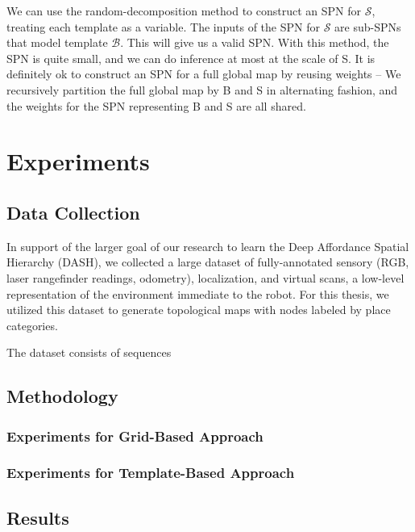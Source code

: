 \documentclass[10pt, titlepage]{article}
\theoremstyle{definition}
\begin{document}
We can use the random-decomposition method to construct an SPN for $\mathcal{S}$, treating each template as a variable. The inputs of the SPN for $\mathcal{S}$ are sub-SPNs that model template $\mathcal{B}$. This will give us a valid SPN. With this method, the SPN is quite small, and we can do inference at most at the scale of S. It is definitely ok to construct an SPN for a full global map by reusing weights -- We recursively partition the full global map by B and S in alternating fashion, and the weights for the SPN representing B and S are all shared.

\newpage
\section{Experiments}\label{section:experiment}
\subsection{Data Collection}\label{section:data}

In support of the larger goal of our research to learn the Deep Affordance Spatial Hierarchy (DASH), we collected a large dataset of fully-annotated sensory (RGB, laser rangefinder readings, odometry), localization, and virtual scans, a low-level representation of the environment immediate to the robot. For this thesis, we utilized this dataset to generate topological maps with nodes labeled by place categories.

The dataset consists of sequences

\subsection{Methodology}\label{section:method}
\subsubsection{Experiments for Grid-Based Approach}\label{section:exp-grid}
\subsubsection{Experiments for Template-Based Approach}\label{section:exp-tmpl}
\subsection{Results}\label{section:results}
\end{document}
